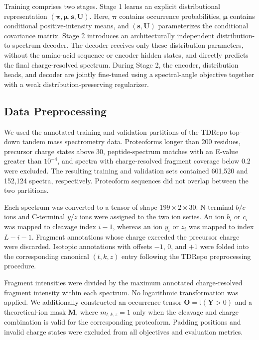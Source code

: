 Training comprises two stages. Stage 1 learns an explicit distributional
representation $(\boldsymbol{\pi},\boldsymbol{\mu},\mathbf{s},\mathbf{U})$.
Here, $\boldsymbol{\pi}$ contains occurrence probabilities,
$\boldsymbol{\mu}$ contains conditional positive-intensity means, and
$(\mathbf{s},\mathbf{U})$ parameterizes the conditional covariance matrix.
Stage 2 introduces an architecturally independent distribution-to-spectrum
decoder. The decoder receives only these distribution parameters, without the
amino-acid sequence or encoder hidden states, and directly predicts the final
charge-resolved spectrum. During Stage 2, the encoder, distribution heads, and
decoder are jointly fine-tuned using a spectral-angle objective together with
a weak distribution-preserving regularizer.

\subsection{Data Preprocessing}
\label{sec:data_preprocessing}

We used the annotated training and validation partitions of the TDRepo
top-down tandem mass spectrometry data. Proteoforms longer than 200 residues,
precursor charge states above 30, peptide-spectrum matches with an E-value
greater than $10^{-4}$, and spectra with charge-resolved fragment coverage
below 0.2 were excluded. The resulting training and validation sets contained
601,520 and 152,124 spectra, respectively. Proteoform sequences did not overlap
between the two partitions.

Each spectrum was converted to a tensor of shape $199\times2\times30$.
N-terminal $b/c$ ions and C-terminal $y/z$ ions were assigned to the two ion
series. An ion $b_i$ or $c_i$ was mapped to cleavage index $i-1$, whereas an
ion $y_i$ or $z_i$ was mapped to index $L-i-1$. Fragment annotations whose
charge exceeded the precursor charge were discarded. Isotopic annotations
with offsets $-1$, $0$, and $+1$ were folded into the corresponding canonical
$(t,k,z)$ entry following the TDRepo preprocessing procedure.

Fragment intensities were divided by the maximum annotated charge-resolved
fragment intensity within each spectrum. No logarithmic transformation was
applied. We additionally constructed an occurrence tensor
$\mathbf{O}=\mathbb{I}(\mathbf{Y}>0)$ and a theoretical-ion mask
$\mathbf{M}$, where $m_{t,k,z}=1$ only when the cleavage and charge combination
is valid for the corresponding proteoform. Padding positions and invalid
charge states were excluded from all objectives and evaluation metrics.

